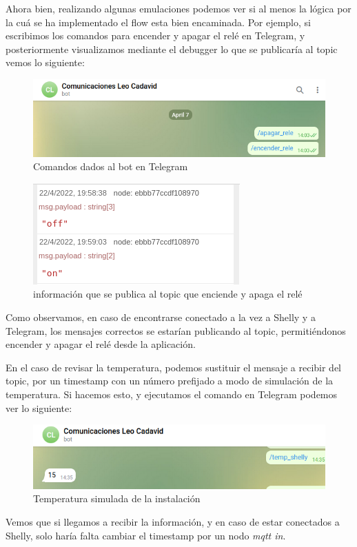 \documentclass[12pt, a4paper]{article}
\begin{document}
Ahora bien, realizando algunas emulaciones podemos ver si al menos la lógica por la cuá se ha implementado el flow esta bien encaminada. Por ejemplo, si escribimos
los comandos para encender y apagar el relé en Telegram, y posteriormente visualizamos mediante el debugger lo que se publicaría al topic vemos lo 
siguiente:

\begin{figure}[H]
    \centering
    \includegraphics[scale=0.5]{telegram_encender_apagar.png}
    \caption{Comandos dados al bot en Telegram}
\end{figure}

\begin{figure}[H]
    \centering
    \includegraphics[scale=0.5]{resultadoencenderapagar.png}
    \caption{información que se publica al topic que enciende y apaga el relé}
\end{figure}

Como observamos, en caso de encontrarse conectado a la vez a Shelly y a Telegram, los mensajes correctos se estarían publicando al topic,
permitiéndonos encender y apagar el relé desde la aplicación.

En el caso de revisar la temperatura, podemos sustituir el mensaje a recibir del topic, por un timestamp con un número prefijado a modo de 
simulación de la temperatura. Si hacemos esto, y ejecutamos el comando en Telegram podemos ver lo siguiente:

\begin{figure}[H]
    \centering
    \includegraphics[scale=0.5]{tempshelly.png}
    \caption{Temperatura simulada de la instalación}
\end{figure}

Vemos que si llegamos a recibir la información, y en caso de estar conectados a Shelly, solo haría falta cambiar el timestamp
por un nodo \textit{mqtt in}.
\end{document}
